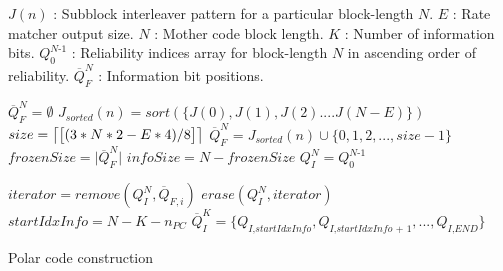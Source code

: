 $J(n)$ : Subblock interleaver pattern for a particular block-length $N$. \newline
$E$    : Rate matcher output size. \newline
$N$	   : Mother code block length. \newline
$K$	   : Number of information bits.\newline
$Q_{\textit{0}}^{\textit{N-1}}$ : Reliability indices array for block-length $N$ in ascending order of reliability. \newline
$\overline{Q}_{\textit{F}}^{\textit{N}}$ : Information bit positions. \newline


\IncMargin{1.5em}
\begin{algorithm}[H]
	$\overline{Q}_{\textit{F}}^{\textit{N}} = \emptyset$ \;
	 {
		 {   %
			$J_{sorted}(n) = sort(\{J(0),J(1),J(2)....J(N-E)\})$\;  \label{line:subblockRef1}
			 {
				$size = \ceil*{\big[(3*N*2 - E*4)/8\big]}$\;
				$\overline{Q}_{F}^{N} = J_{sorted}(n) \cup \{0,1,2, ... ,size-1\}$ \label{line:subblockRef2}
			} 	
		} 
	}
	$frozenSize = \big|\overline{Q}_{F}^{N}\big|$ \;
	$infoSize = N - frozenSize$ \;
	$Q_{\textit{I}}^{\textit{N}} = Q_{\textit{0}}^{\textit{N-1}}$ \;
	
	 {
		$iterator = remove(Q_{\textit{I}}^{\textit{N}},\overline{Q}_{F,i})$ \;
		$erase(Q_{\textit{I}}^{\textit{N}},iterator)$ \;
	}
	$startIdxInfo = N - K - n_{PC}$ \;
	$\overline{Q}_{\textit{I}}^{\textit{K}} = \{Q_{\textit{I,startIdxInfo}},Q_{\textit{I,startIdxInfo + 1}},...,Q_{\textit{I,END}}\}$
	\caption{Polar code construction}
	\label{algo:polarCodeConstuctionAlgo}
\end{algorithm}
\DecMargin{1.5em}

